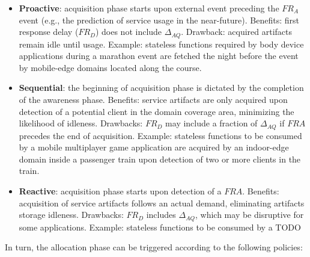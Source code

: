 \begin{itemize}

\item \textbf{Proactive}: acquisition phase starts upon external event preceding the $FR_A$ event (e.g., the prediction of service usage in the near-future). Benefits: first response delay ($FR_D$) does not include $\Delta_{AQ}$. Drawback: acquired artifacts remain idle until usage. Example: stateless functions required by body device applications during a marathon event are fetched the night before the event by mobile-edge domains located along the course. 

\item \textbf{Sequential}: the beginning of acquisition phase is dictated by the completion of the awareness phase. Benefits: service artifacts are only acquired upon detection of a potential client in the domain coverage area, minimizing the likelihood of idleness. Drawbacks: $FR_D$ may include a fraction of $\Delta_{AQ}$ if $FRA$ precedes the end of acquisition. Example: stateless functions to be consumed by a mobile multiplayer game application are acquired by an indoor-edge domain inside a passenger train upon detection of two or more clients in the train.

\item \textbf{Reactive}: acquisition phase starts upon detection of a $FRA$. Benefits: acquisition of service artifacts follows an actual demand, eliminating artifacts storage idleness. Drawbacks: $FR_D$ includes $\Delta_{AQ}$, which may be disruptive for some applications. Example: stateless functions to be consumed by a TODO 


\end{itemize}

In turn, the allocation phase can be triggered according to the following policies:


